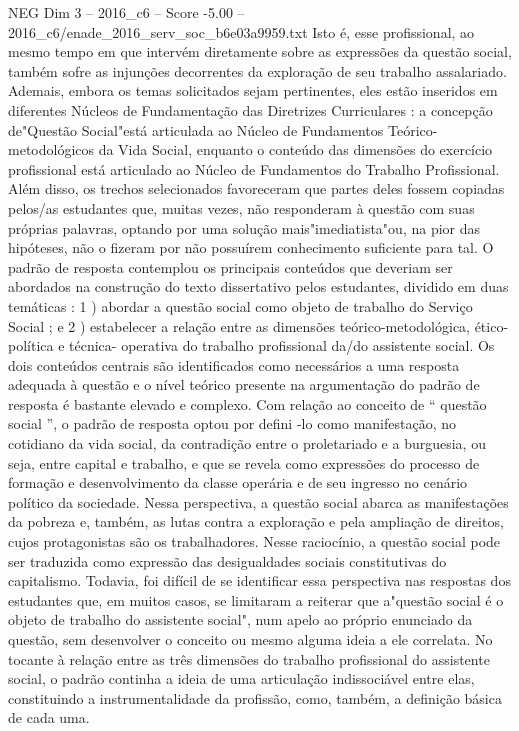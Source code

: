 \begin{textsample}{NEG Dim 3 – 2016\_c6 – Score -5.00 – 2016\_c6/enade\_2016\_serv\_soc\_b6e03a9959.txt}
Isto é, esse profissional, ao mesmo tempo em que intervém diretamente sobre as expressões da questão social, também sofre as injunções decorrentes da exploração de seu trabalho assalariado.
Ademais, embora os temas solicitados sejam pertinentes, eles estão inseridos em diferentes Núcleos de Fundamentação das Diretrizes Curriculares : a concepção de"Questão Social"está articulada ao Núcleo de Fundamentos Teórico-metodológicos da Vida Social, enquanto o conteúdo das dimensões do exercício profissional está articulado ao Núcleo de Fundamentos do Trabalho Profissional.
Além disso, os trechos selecionados favoreceram que partes deles fossem copiadas pelos/as estudantes que, muitas vezes, não responderam à questão com suas próprias palavras, optando por uma solução mais"imediatista"ou, na pior das hipóteses, não o fizeram por não possuírem conhecimento suficiente para tal.
O padrão de resposta contemplou os principais conteúdos que deveriam ser abordados na construção do texto dissertativo pelos estudantes, dividido em duas temáticas : 1 ) abordar a questão social como objeto de trabalho do Serviço Social ; e 2 ) estabelecer a relação entre as dimensões teórico-metodológica, ético-política e técnica- operativa do trabalho profissional da/do assistente social.
Os dois conteúdos centrais são identificados como necessários a uma resposta adequada à questão e o nível teórico presente na argumentação do padrão de resposta é bastante elevado e complexo.
Com relação ao conceito de “ questão social ”, o padrão de resposta optou por defini -lo como manifestação, no cotidiano da vida social, da contradição entre o proletariado e a burguesia, ou seja, entre capital e trabalho, e que se revela como expressões do processo de formação e desenvolvimento da classe operária e de seu ingresso no cenário político da sociedade.
Nessa perspectiva, a questão social abarca as manifestações da pobreza e, também, as lutas contra a exploração e pela ampliação de direitos, cujos protagonistas são os trabalhadores.
Nesse raciocínio, a questão social pode ser traduzida como expressão das desigualdades sociais constitutivas do capitalismo.
Todavia, foi difícil de se identificar essa perspectiva nas respostas dos estudantes que, em muitos casos, se limitaram a reiterar que a"questão social é o objeto de trabalho do assistente social", num apelo ao próprio enunciado da questão, sem desenvolver o conceito ou mesmo alguma ideia a ele correlata.
No tocante à relação entre as três dimensões do trabalho profissional do assistente social, o padrão continha a ideia de uma articulação indissociável entre elas, constituindo a instrumentalidade da profissão, como, também, a definição básica de cada uma.

\end{textsample}
